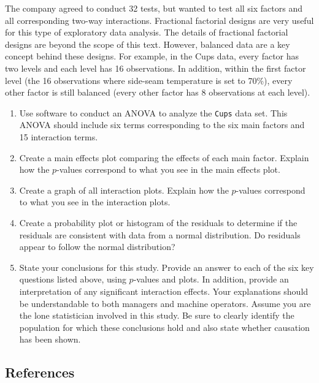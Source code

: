 \documentclass[
]{report}
\begin{document}
\begin{enumerate}
The company agreed to conduct 32 tests, but wanted to test all six factors and all corresponding two-way interactions. Fractional factorial designs are very useful for this type of exploratory data analysis. The details of fractional factorial designs are beyond the scope of this text. However, balanced data are a key concept behind these designs. For example, in the Cups data, every factor has two levels and each level has 16 observations. In addition, within the first factor level (the 16 observations where side-seam temperature is set to 70\%), every other factor is still balanced (every other factor has 8 observations at each level).

  \begin{enumerate}
    \item Use software to conduct an ANOVA to analyze the \texttt{Cups} data set. This ANOVA should include six terms corresponding to the six main factors and 15 interaction terms.
    \item Create a main effects plot comparing the effects of each main factor. Explain how the $p$-values correspond to what you see in the main effects plot.
    \item Create a graph of all interaction plots. Explain how the $p$-values correspond to what you see in the interaction plots.
    \item Create a probability plot or histogram of the residuals to determine if the residuals are consistent with data from a normal distribution. Do residuals appear to follow the normal distribution?
    \item State your conclusions for this study. Provide an answer to each of the six key questions listed above, using $p$-values and plots. In addition, provide an interpretation of any significant interaction effects. Your explanations should be understandable to both managers and machine operators. Assume you are the lone statistician involved in this study. Be sure to clearly identify the population for which these conclusions hold and also state whether causation has been shown.
  \end{enumerate}

\end{enumerate}

\hypertarget{references-3}{%
\subsection*{References}\label{references-3}}
\end{document}
